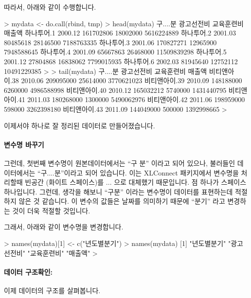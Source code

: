 \documentclass[tutorial.tex]{subfiles}
\begin{document}
따라서, 아래와 같이 수행합니다. 

\begin{Schunk}
\begin{Soutput}
> mydata <- do.call(rbind, tmp)
> head(mydata)
           구....분 광고선전비 교육훈련비      매출액
하나투어.1  2000.12  161702806   18002000  5616224889
하나투어.2  2001.03   80485618   28146500  7188763335
하나투어.3  2001.06  170827271   12965900  7948588645
하나투어.4  2001.09   65667863   26468000 11509839298
하나투어.5  2001.12   27804868   16838062  7799015935
하나투어.6  2002.03   81945640   12752112 10491229385
> 
> tail(mydata)
              구....분 광고선전비 교육훈련비     매출액
비티앤아이.38  2010.06  209095000   25614000 3770621023
비티앤아이.39  2010.09  148188000    6260000 4986588998
비티앤아이.40  2010.12  165032212    5740000 1431440795
비티앤아이.41  2011.03  180268000    1300000 5490062976
비티앤아이.42  2011.06  198959000     598000 3262398180
비티앤아이.43  2011.09  144049000     500000 1392998665
> 
\end{Soutput}
\end{Schunk}

이제서야 하나로 잘 정리된 데이터로 만들어졌습니다.

\paragraph{변수명 바꾸기}
그런데, 첫번째 변수명이 원본데이터에서는 ``구    분'' 이라고 되어 있으나,  불러들인 데이터에서는 ``구....분''이라고 되어 있습니다. 
이는 XLConnect 패키지에서 변수명을 처리할때 빈공간 (화이트 스페이스)를 ... 으로 대체했기 때문입니다.
점 하나가 스페이스 하나입니다.
그런데, 생각을 해보니 ``구분'' 이라는 변수명이 데이터를 표현하는데 적절하지 않은 것 같습니다.
이 변수의 값들은 날짜를 의미하기 때문에 ``분기'' 라고 변경하는 것이 더욱 적절할 것입니다.

그래서, 아래와 같이 변수명을 변경합니다.

\begin{Schunk}
\begin{Soutput}
> names(mydata)[1] <- c("년도별분기")
> names(mydata)
[1] "년도별분기" "광고선전비" "교육훈련비" "매출액"    
> 
\end{Soutput}
\end{Schunk}

\paragraph{데이터 구조확인:}
이제 데이터의 구조를 살펴봅니다.
\end{document}
